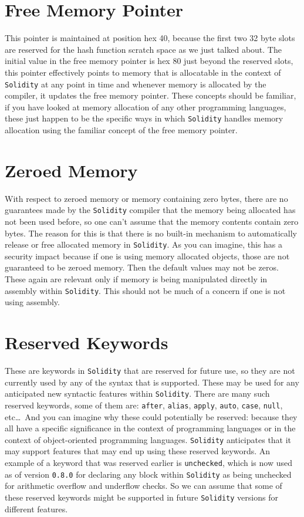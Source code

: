 \section{Free Memory Pointer}
This pointer is maintained at position hex 40, because the first two 32 byte slots are reserved for the hash function scratch space as we just talked about. The initial value in the free memory pointer is hex 80 just beyond the reserved slots, this pointer effectively points to memory that is allocatable in the context of \verb|Solidity| at any point in time and whenever memory is allocated by the compiler, it updates the free memory pointer. These concepts should be familiar, if you have looked at memory allocation of any other programming languages, these just happen to be the specific ways in which \verb|Solidity| handles memory allocation using the familiar concept of the free memory pointer.

\section{Zeroed Memory}
With respect to zeroed memory or memory containing zero bytes, there are no guarantees made by the \verb|Solidity| compiler that the memory being allocated has not been used before, so one can't assume that the memory contents contain zero bytes. The reason for this is that there is no built-in mechanism to automatically release or free allocated memory in \verb|Solidity|. As you can imagine, this has a security impact because if one is using memory allocated objects, those are not guaranteed to be zeroed memory. Then the default values may not be zeros. These again are relevant only if memory is being manipulated directly in assembly within \verb|Solidity|. This should not be much of a concern if one is not using assembly.

\section{Reserved Keywords}
These are keywords in \verb|Solidity| that are reserved for future use, so they are not currently used by any of the syntax that is supported. These may be used for any anticipated new syntactic features within \verb|Solidity|. There are many such reserved keywords, some of them are: \verb|after|, \verb|alias|, \verb|apply|, \verb|auto|, \verb|case|, \verb|null|, etc\dots\, And you can imagine why these could potentially be reserved: because they all have a specific significance in the context of programming languages or in the context of object-oriented programming languages. \verb|Solidity| anticipates that it may support features that may end up using these reserved keywords. An example of a keyword that was reserved earlier is \verb|unchecked|, which is now used as of version \verb|0.8.0| for declaring any block within \verb|Solidity| as being unchecked for arithmetic overflow and underflow checks. So we can assume that some of these reserved keywords might be supported in future \verb|Solidity| versions for different features.

